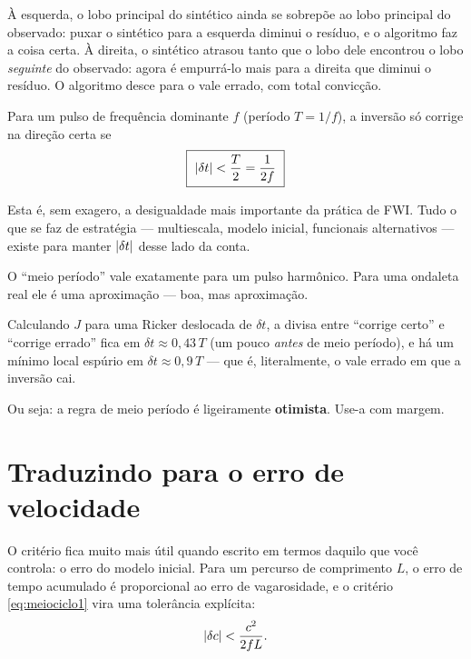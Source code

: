 \documentclass[11pt,a4paper,oneside]{report}
\begin{document}
\`A esquerda, o lobo principal do sint\'etico ainda se sobrep\~oe ao lobo
principal do observado: puxar o sint\'etico para a esquerda diminui o
res\'iduo, e o algoritmo faz a coisa certa. \`A direita, o sint\'etico
atrasou tanto que o lobo dele encontrou o lobo \emph{seguinte} do observado:
agora \'e empurr\'a-lo mais para a direita que diminui o res\'iduo. O
algoritmo desce para o vale errado, com total convic\c{c}\~ao.

\begin{teoria}
Para um pulso de frequ\^encia dominante $f$ (per\'iodo $T = 1/f$), a
invers\~ao s\'o corrige na dire\c{c}\~ao certa se
\begin{equation}
\boxed{\ \lvert \delta t \rvert < \frac{T}{2} = \frac{1}{2f}\ }
\label{eq:meiociclo1}
\end{equation}

Esta \'e, sem exagero, a desigualdade mais importante da pr\'atica de FWI.
Tudo o que se faz de estrat\'egia --- multiescala, modelo inicial,
funcionais alternativos --- existe para manter $\lvert \delta t \rvert$ desse lado da
conta.
\end{teoria}

\begin{atencao}
O ``meio per\'iodo'' vale exatamente para um pulso harm\^onico. Para uma
ondaleta real ele \'e uma aproxima\c{c}\~ao --- boa, mas aproxima\c{c}\~ao.

Calculando $J$ para uma Ricker deslocada de $\delta t$, a divisa entre
``corrige certo'' e ``corrige errado'' fica em $\delta t \approx 0{,}43\,T$
(um pouco \emph{antes} de meio per\'iodo), e h\'a um m\'inimo local esp\'urio
em $\delta t \approx 0{,}9\,T$ --- que \'e, literalmente, o vale errado em
que a invers\~ao cai.

Ou seja: a regra de meio per\'iodo \'e ligeiramente \textbf{otimista}. Use-a
com margem.
\end{atencao}

\section{Traduzindo para o erro de velocidade}

O crit\'erio fica muito mais \'util quando escrito em termos daquilo que
voc\^e controla: o erro do modelo inicial. Para um percurso de comprimento
$L$, o erro de tempo acumulado \'e proporcional ao erro de vagarosidade, e o
crit\'erio \eqref{eq:meiociclo1} vira uma toler\^ancia expl\'icita:
\begin{equation}
\lvert \delta c \rvert < \frac{c^{2}}{2 f L}.
\label{eq:tolerancia1}
\end{equation}
\end{document}
